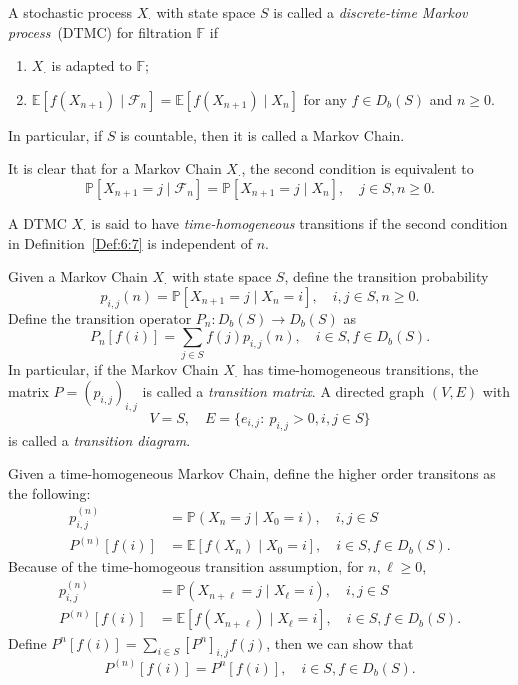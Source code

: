 \begin{definition}\label{Def:6:7}
A stochastic process $X_{\cdot}$ with state space $S$ is called a \emph{discrete-time Markov process}~(DTMC) for filtration $\mathbb{F}$ if
\begin{enumerate}
\item
$X_{\cdot}$ is adapted to $\mathbb{F}$;
\item
$\mathbb{E}[f(X_{n+1})\mid\mathcal{F}_n] = \mathbb{E}[f(X_{n+1})\mid X_n]$ for any $f\in D_b(S)$ and $n\ge0$.
\end{enumerate}
In particular, if $S$ is countable, then it is called a Markov Chain.
\end{definition}
It is clear that for a Markov Chain $X_{\cdot}$, the second condition is equivalent to 
\[
\mathbb{P}[X_{n+1}=j\mid\mathcal{F}_n] = \mathbb{P}[X_{n+1}=j\mid X_n],\quad j\in S, n\ge0.
\]

\begin{definition}
A DTMC $X_{\cdot}$ is said to have \emph{time-homogeneous} transitions if the second condition in Definition~\ref{Def:6:7} is independent of $n$. 
\end{definition}

\begin{definition}
Given a Markov Chain $X_{\cdot}$ with state space $S$, define the transition probability
\[
p_{i,j}(n) = \mathbb{P}[X_{n+1}=j\mid X_n=i],\quad i,j\in S, n\ge0.
\]
Define the transition operator $P_n: D_b(S)\to D_b(S)$ as
\[
P_n[f(i)] = \sum_{j\in S}f(j)p_{i,j}(n),\quad i\in S, f\in D_b(S).
\]
In particular, if the Markov Chain $X_{\cdot}$ has time-homogeneous transitions, the matrix $P=(p_{i,j})_{i,j}$ is called a \emph{transition matrix}.
A directed graph $(V,E)$ with 
\[
V=S,\quad E=\{e_{i,j}:~p_{i,j}>0, i,j\in S\}
\]
is called a \emph{transition diagram}.
\end{definition}

Given a time-homogeneous Markov Chain, define the higher order transitons as the following:
\begin{align*}
p_{i,j}^{(n)}&=\mathbb{P}(X_{n}=j\mid X_0=i),\quad i,j\in S\\
P^{(n)}[f(i)]&=\mathbb{E}[f(X_n)\mid X_0=i],\quad i\in S, f\in D_b(S).
\end{align*}
Because of the time-homogeous transition assumption, for $n,\ell\ge0$,
\begin{align*}
p_{i,j}^{(n)}&=\mathbb{P}(X_{n+\ell}=j\mid X_{\ell}=i),\quad i,j\in S\\
P^{(n)}[f(i)]&=\mathbb{E}[f(X_{n+\ell})\mid X_{\ell}=i],\quad i\in S, f\in D_b(S).
\end{align*}
Define $P^n[f(i)] = \sum_{i\in S}[P^n]_{i,j}f(j)$, then we can show that 
\[
P^{(n)}[f(i)] = P^n[f(i)],\quad i\in S, f\in D_b(S).
\]

